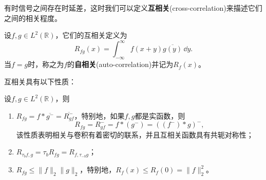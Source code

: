 有时信号之间存在时延差，这时我们可以定义\textbf{互相关}(cross-correlation)来描述它们之间的相关程度。
\begin{definition}[互相关]
    设$f,g\in L^2(\mathbb{R})$，它们的互相关定义为
    \begin{equation}
        R_{fg}(x)=\int_{-\infty}^{\infty}f(x+y)\overline{g(y)}\,\dd y.
    \end{equation}
    当$f=g$时，称之为$f$的\textbf{自相关}(auto-correlation)并记为$R_f(x)$。
\end{definition}

互相关具有以下性质：
\begin{proposition}
    \label{prop:cross_correlation}
    设$f,g\in L^2(\mathbb{R})$，则
    \begin{enumerate}
        \item $R_{fg}=f* \overline{g^-}=\overline{R_{gf}^-}$，特别地，如果$f,g$都是实函数，则
              \begin{equation}
                  R_{fg} =R_{gf}^- =f *(g^-)=((f^-)*g)^-,
              \end{equation}
              该性质表明相关与卷积有着密切的联系，并且互相关函数具有共轭对称性；
        \item $R_{\tau_b f,g}=\tau_{b}R_{fg}=R_{f,\tau_{-b}g}$；
        \item $R_{fg}\leq\|f\|_2\|g\|_2$，特别地，$R_f(x)\leq R_f(0)=\|f\|_2^2$。
    \end{enumerate}
\end{proposition}

